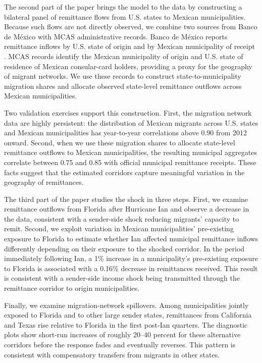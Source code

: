 The second part of the paper brings the model to the data by constructing a bilateral panel of remittance flows from U.S. states to Mexican municipalities. Because such flows are not directly observed, we combine two sources from Banco de M{\'e}xico with MCAS administrative records. Banco de M{\'e}xico reports remittance inflows by U.S. state of origin and by Mexican municipality of receipt \parencite{banxico_ce168, banxico_ce166}. MCAS records identify the Mexican municipality of origin and U.S. state of residence of Mexican consular-card holders, providing a proxy for the geography of migrant networks. We use these records to construct state-to-municipality migration shares and allocate observed state-level remittance outflows across Mexican municipalities.

Two validation exercises support this construction. First, the migration network data are highly persistent: the distribution of Mexican migrants across U.S. states and Mexican municipalities has year-to-year correlations above 0.90 from 2012 onward. Second, when we use these migration shares to allocate state-level remittance outflows to Mexican municipalities, the resulting municipal aggregates correlate between 0.75 and 0.85 with official municipal remittance receipts. These facts suggest that the estimated corridors capture meaningful variation in the geography of remittances.

The third part of the paper studies the shock in three steps. First, we examine remittance outflows from Florida after Hurricane Ian and observe a decrease in the data, consistent with a sender-side shock reducing migrants' capacity to remit. Second, we exploit variation in Mexican municipalities' pre-existing exposure to Florida to estimate whether Ian affected municipal remittance inflows differently depending on their exposure to the shocked corridor. In the period immediately following Ian, a 1\% increase in a municipality's pre-existing exposure to Florida is associated with a 0.16\% decrease in remittances received. This result is consistent with a sender-side income shock being transmitted through the remittance corridor to origin municipalities.

Finally, we examine migration-network spillovers. Among municipalities jointly exposed to Florida and to other large sender states, remittances from California and Texas rise relative to Florida in the first post-Ian quarters. The diagnostic plots show short-run increases of roughly 20--40 percent for these alternative corridors before the response fades and eventually reverses. This pattern is consistent with compensatory transfers from migrants in other states.


